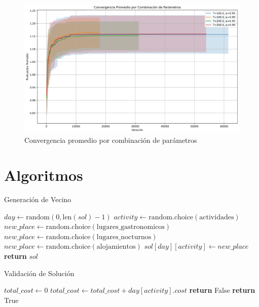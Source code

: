 \documentclass[10pt]{llncs}
\begin{document}
\begin{figure}[H]
\centering
\includegraphics[width=1\textwidth]{../src/experiments/algorithm_exp/avg_convergence_20250620-190453.png}
\caption{Convergencia promedio por combinación de parámetros}
\label{fig:avg_convergence}
\end{figure}

\newpage
\section{Algoritmos}

\begin{algorithm}
\caption{Generación de Vecino}
\label{alg:nb_gen}
\begin{algorithmic}[1]
\State $day \gets \text{random}(0, \text{len}(sol)-1)$
\State $activity \gets \text{random.choice}(\text{actividades})$
    \State $new\_place \gets \text{random.choice}(\text{lugares\_gastronomicos})$
    \State $new\_place \gets \text{random.choice}(\text{lugares\_nocturnos})$
\Else
    \State $new\_place \gets \text{random.choice}(\text{alojamientos})$
\EndIf
\State $sol[day][activity] \gets new\_place$
\State \textbf{return} $sol$
\EndProcedure
\end{algorithmic}
\end{algorithm}

\begin{algorithm}
\caption{Validación de Solución}
\label{alg:sol_valid}
\begin{algorithmic}[1]
    \State $total\_cost \gets 0$
        \State $total\_cost \gets total\_cost + day[activity].cost$
    \EndFor
        \State \textbf{return} False
    \EndIf
\EndFor
\State \textbf{return} True
\EndProcedure
\end{algorithmic}
\end{algorithm}
\end{document}
